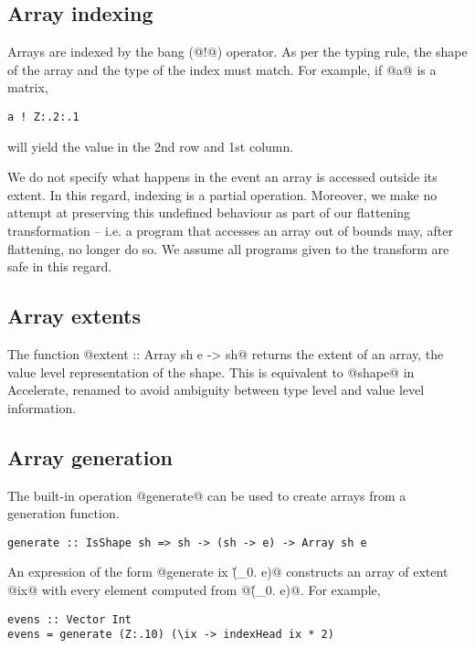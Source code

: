 
\subsection{Array indexing}

Arrays are indexed by the bang (@!@) operator. As per the typing rule, the shape of the array and the type of the index must match. For example, if @a@ is a matrix,
%
\begin{lstlisting}
a ! Z:.2:.1
\end{lstlisting}
%
will yield the value in the 2nd row and 1st column.

We do not specify what happens in the event an array is accessed outside its extent. In this regard, indexing is a partial operation. Moreover, we make no attempt at preserving this undefined behaviour as part of our flattening transformation -- i.e. a program that accesses an array out of bounds may, after flattening, no longer do so. We assume all programs given to the transform are safe in this regard.

\subsection{Array extents}
The function @extent :: Array sh e -> sh@ returns the extent of an array, the value level representation of the shape. This is equivalent to @shape@ in Accelerate, renamed to avoid ambiguity between type level and value level information.

\subsection{Array generation}
The built-in operation @generate@ can be used to create arrays from a generation function.
%
\begin{lstlisting}
generate :: IsShape sh => sh -> (sh -> e) -> Array sh e
\end{lstlisting}
%
An expression of the form @generate ix (\v_0. e)@ constructs an array of extent @ix@ with every element computed from @(\v_0. e)@. For example,
%
\begin{lstlisting}
evens :: Vector Int
evens = generate (Z:.10) (\ix -> indexHead ix * 2)
\end{lstlisting}

